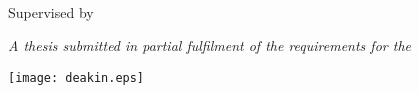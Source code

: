 \vspace*{\fill}
\thispagestyle{empty}
\linespread{1.2}

\centering

\LARGE
\textbf{\thetitle}
\vspace{1 cm}

\Large
\theauthor{}
\\
\vspace{-0.25 cm}
{\normalsize \theauthorspostnominals{}}
\vspace{0.75 cm}

\large
Supervised by \thesupervisor

\vspace{1 cm}

\itshape
A thesis submitted in partial fulfilment of the requirements for the\\
\upshape
\thedegree

\vspace{1.5 cm}
\texttt{[image: deakin.eps]}
\vspace{1.5 cm}

\upshape
\theinstitution

\vspace{1cm}
\thedate
\vspace*{\fill}

\justify
\normalsize
\restoregeometry